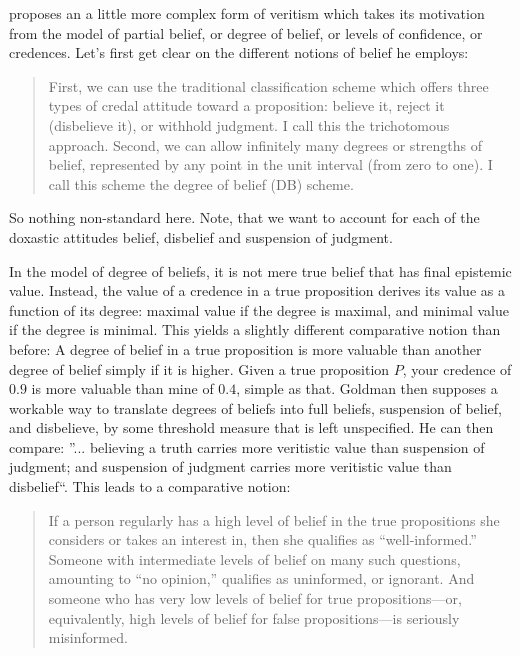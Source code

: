 \documentclass[12pt,numbers=noenddot]{scrartcl}
\begin{document}
\textcite[58]{Goldman2002-GOLTUO-2} proposes an a little more complex form of veritism which takes its motivation from the model of partial belief, or degree of belief, or levels of confidence, or credences. Let's first get clear on the different notions of belief he employs:

\begin{quote}
    First, we can use the traditional classification scheme which offers three types of credal attitude toward a proposition: believe it, reject it (disbelieve it), or withhold judgment. I call this the trichotomous approach. Second, we can allow infinitely many degrees or strengths of belief, represented by any point in the unit interval (from zero to one). I call this scheme the degree of belief (DB) scheme. \textcite[88]{Goldman1999-GOLKIA}
\end{quote}

So nothing non-standard here. Note, that we want to account for each of the doxastic attitudes belief, disbelief and suspension of judgment.

In the model of degree of beliefs, it is not mere true belief that has final epistemic value. Instead, the value of a credence in a true proposition derives its value as a function of its degree: maximal value if the degree is maximal, and minimal value if the degree is minimal. This yields a slightly different comparative notion than before: A degree of belief in a true proposition is more valuable than another degree of belief simply if it is higher. Given a true proposition $P$, your credence of $0.9$ is more valuable than mine of $0.4$, simple as that.
Goldman then supposes a workable way to translate degrees of beliefs into full beliefs, suspension of belief, and disbelieve, by some threshold measure that is left unspecified. He can then compare: ”... believing a truth carries more veritistic value than suspension of judgment; and suspension of judgment carries more veritistic value than disbelief“. This leads to a comparative notion:

\begin{quote}
    If a person regularly has a high level of belief in the true propositions she considers or takes an interest in, then she qualifies as “well‐informed.” Someone with intermediate levels of belief on many such questions, amounting to “no opinion,” qualifies as uninformed, or ignorant. And someone who has very low levels of belief for true propositions—or, equivalently, high levels of belief for false propositions—is seriously misinformed. \textcite[58]{Goldman2002-GOLTUO-2}
\end{quote}
\end{document}
